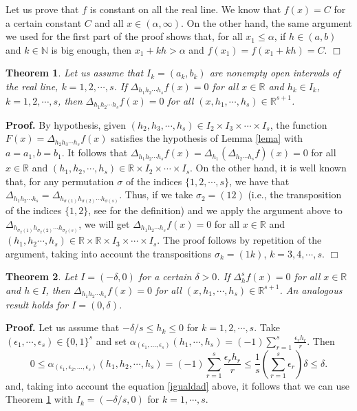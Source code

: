 \documentclass[12pt,a4paper]{amsart}
\newtheorem{theorem}{Theorem}[section]
\theoremstyle{definition}
\begin{document}
Let us prove that $f$ is constant on all the real line. We know that $f(x)=C$ for a certain constant $C$ and all $x\in (\alpha,\infty)$. On the other hand,  the same argument we used for the first part of the proof shows that, for all $x_1\leq \alpha$, if  $h\in (a,b)$ and $k\in\mathbb{N}$ is big enough, then $x_1+kh>\alpha$ and $f(x_1)=f(x_1+kh)=C$. {\hfill $\Box$}

\begin{theorem}\label{dos} Let us assume that $I_k=(a_k,b_k)$ are nonempty open intervals of the real line, $k=1,2,\cdots,s$.  If $\Delta_{h_1h_2\cdots h_s}f(x)=0$ for all $x\in\mathbb{R}$ and $h_k\in I_k$, $k=1,2,\cdots,s$, then $\Delta_{h_1h_2\cdots h_s}f(x)=0$ for all $(x,h_1,\cdots,h_s)\in\mathbb{R}^{s+1}$.
\end{theorem}

\noindent \textbf{Proof.}  By hypothesis, given $(h_2,h_3,\cdots,h_s)\in I_2\times I_3\times \cdots \times I_s$, the function $F(x)=\Delta_{h_2h_3\cdots h_s}f(x)$ satisfies the hypothesis of Lemma \ref{lema} with $a=a_1,b=b_1$. It follows that $\Delta_{h_1h_2\cdots h_s}f(x)=\Delta_{h_1}(\Delta_{h_2 \cdots h_s}f)(x)=0$ for all $x\in\mathbb{R}$ and $(h_1,h_2,\cdots,h_s)\in \mathbb{R}\times I_2\times\cdots\times I_s$. On the other hand, it is well known \cite[Corollary 9.1, p. 66]{czerwik} that, for any permutation $\sigma$ of the indices $\{1,2,\cdots,s\}$, we have that  $\Delta_{h_1h_2\cdots h_s}=\Delta_{h_{\sigma(1)} h_{\sigma(2)} \cdots h_{\sigma(s)}}$. Thus, if we take $\sigma_2=(12)$ (i.e., the transposition of the indices $\{1,2\}$, see \cite[p. 49]{jacobson} for the definition) and we apply the argument above to $\Delta_{h_{\sigma_2(1)} h_{\sigma_2(2)} \cdots h_{\sigma_2(s)}}$, we will get
$\Delta_{h_1h_2\cdots h_s}f(x)=0$ for all $x\in\mathbb{R}$ and $(h_1,h_2\cdots,h_s)\in \mathbb{R}\times \mathbb{R}\times I_3\times\cdots\times I_s$. The proof follows by repetition of the argument, taking into account the transpositions $\sigma_k=(1k)$, $k=3,4,\cdots,s$. {\hfill $\Box$}

\begin{theorem}\label{tres} Let $I=(-\delta,0)$ for a certain $\delta>0$. If $\Delta_{h}^sf(x)=0$ for all $x\in\mathbb{R}$ and $h\in I$, then $\Delta_{h_1h_2\cdots h_s}f(x)=0$ for all $(x,h_1,\cdots,h_s)\in\mathbb{R}^{s+1}$. An analogous result holds for $I=(0,\delta)$.
\end{theorem}
\noindent \textbf{Proof. } Let us assume that $-\delta/s\leq h_k\leq 0$ for $k=1,2,\cdots,s$. Take $(\epsilon_1,\cdots,\epsilon_s)\in\{0,1\}^s$ and set $\alpha_{(\epsilon_1,\dots,\epsilon_s)}(h_1,\cdots,h_s)=(-1)\sum_{r=1}^s\frac{\epsilon_rh_r}{r}$. Then
\[
0\leq \alpha_{(\epsilon_1,\epsilon_2,\dots,\epsilon_s)}(h_1,h_2,\cdots,h_s)=(-1)\sum_{r=1}^s\frac{\epsilon_rh_r}{r} \leq  \frac{1}{s}\left(\sum_{r=1}^s\epsilon_r\right)\delta\leq \delta.
\]
and, taking into account the equation \eqref{igualdad} above, it follows that we can use Theorem \ref{dos} with $I_k=(-\delta/s,0)$ for $k=1,\cdots,s$.
\end{document}
